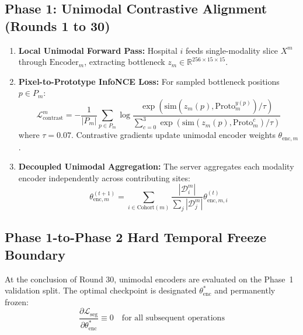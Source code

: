 \documentclass[10pt,a4paper]{article}
\begin{document}
\subsection{Phase 1: Unimodal Contrastive Alignment (Rounds 1 to 30)}
\begin{enumerate}[itemsep=1pt, topsep=1pt]
    \item \textbf{Local Unimodal Forward Pass:} Hospital $i$ feeds single-modality slice $X^m$ through $\text{Encoder}_m$, extracting bottleneck $z_m \in \mathbb{R}^{256 \times 15 \times 15}$.
    \item \textbf{Pixel-to-Prototype InfoNCE Loss:} For sampled bottleneck positions $p \in P_m$:
    \begin{equation}
        \mathcal{L}_{\text{contrast}}^m = -\frac{1}{|P_m|} \sum_{p \in P_m} \log \frac{\exp\left( \text{sim}(z_m(p), \text{Proto}_m^{y(p)}) / \tau \right)}{\sum_{c=0}^3 \exp\left( \text{sim}(z_m(p), \text{Proto}_m^c) / \tau \right)}
    \end{equation}
    where $\tau = 0.07$. Contrastive gradients update unimodal encoder weights $\theta_{\text{enc}, m}$.
    \item \textbf{Decoupled Unimodal Aggregation:} The server aggregates each modality encoder independently across contributing sites:
    \begin{equation}
        \theta_{\text{enc}, m}^{(t+1)} = \sum_{i \in \text{Cohort}(m)} \frac{|\mathcal{D}_i^m|}{\sum_{j} |\mathcal{D}_j^m|} \theta_{\text{enc}, m, i}^{(t)}
    \end{equation}
\end{enumerate}

\subsection{Phase 1-to-Phase 2 Hard Temporal Freeze Boundary}
At the conclusion of Round 30, unimodal encoders are evaluated on the Phase~1 validation split. The optimal checkpoint is designated $\theta_{\text{enc}}^*$ and permanently frozen:
\begin{equation}
    \frac{\partial \mathcal{L}_{\text{seg}}}{\partial \theta_{\text{enc}}^*} \equiv 0 \quad \text{for all subsequent operations}
\end{equation}
\end{document}
